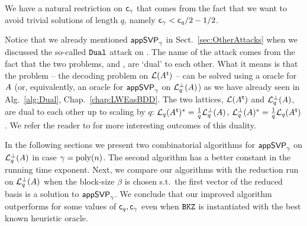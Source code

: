 We have a natural restriction on $\mathsf{c}_{\gamma}$ that comes from the fact that we want to avoid trivial solutions of length $q$, namely $\mathsf{c}_{\gamma}<\mathsf{c}_q/2 - 1/2$. 

Notice that we already mentioned $\textsf{appSVP}_{\gamma}$ in Sect.~\ref{sec:OtherAttacks} when we discussed the so-called $\texttt{Dual}$ attack on \LWE. The name of the attack comes from the fact that the two problems, \LWE and \SIS, are `dual' to each other. What it means is that the \LWE problem -- the decoding problem on $\mathcal{L}(A\mkern0.7mu^{\mathsf{ t}})$ -- can be solved using a \SIS oracle for $A$ (or, equivalently, an oracle for $\textsf{appSVP}_{\gamma}$ on $\mathcal{L}_q^{\perp}(A)$) as we have already seen in Alg.~\ref{alg:Dual}, Chap.~\ref{chap:LWEasBDD}. The two lattices, $\mathcal{L}(A\mkern0.7mu^{\mathsf{ t}})$ and $\mathcal{L}_q^{\perp}(A)$, are dual to each other up to scaling by $q$: $\mathcal{L}_q(A\mkern0.7mu^{\mathsf{ t}})^* = \frac{1}{q} \mathcal{L}_q^{\perp}(A)$, $\mathcal{L}_q^{\perp}(A)^* = \frac{1}{q}\mathcal{L}_q(A\mkern0.7mu^{\mathsf{ t}})$.  
We refer the reader to \cite{Mic10} for more interesting outcomes of this duality.

In the following sections we present two combinatorial algorithms for $\textsf{appSVP}_{\gamma}$ on $\mathcal{L}_q^{\perp}(A)$ in case $\gamma =\mathrm{poly}(n)$. The second algorithm has a better constant in the running time exponent. Next, we compare our algorithms with the \BKZ reduction run on $\mathcal{L}_q^{\perp}(A)$ when the block-size $\beta$ is chosen s.t.\ the first vector of the reduced basis is a solution to $\textsf{appSVP}_{\gamma}$. We conclude that our improved algorithm outperforms \BKZ for some values of $\mathsf{c}_q, \mathsf{c}_{\gamma}$ even when $\texttt{BKZ}$ is instantiated with the best known heuristic \SVP oracle.











%